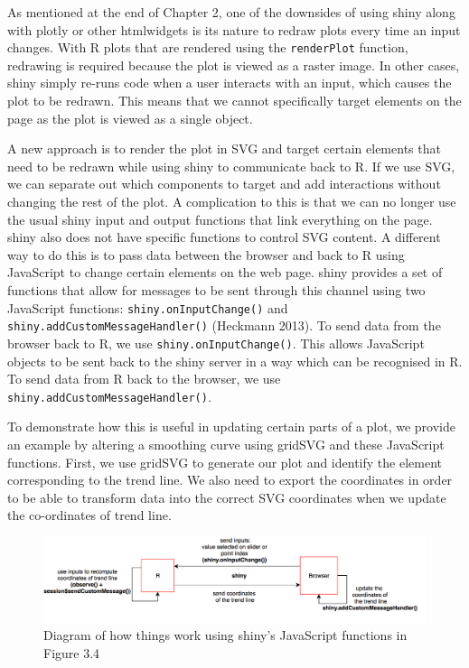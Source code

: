 \documentclass[11pt,]{report}
\begin{document}
As mentioned at the end of Chapter 2, one of the downsides of using
\textsf{shiny} along with \textsf{plotly} or other htmlwidgets is its
nature to redraw plots every time an input changes. With R plots that
are rendered using the \texttt{renderPlot} function, redrawing is
required because the plot is viewed as a raster image. In other cases,
\textsf{shiny} simply re-runs code when a user interacts with an input,
which causes the plot to be redrawn. This means that we cannot
specifically target elements on the page as the plot is viewed as a
single object.

A new approach is to render the plot in SVG and target certain elements
that need to be redrawn while using \textsf{shiny} to communicate back
to R. If we use SVG, we can separate out which components to target and
add interactions without changing the rest of the plot. A complication
to this is that we can no longer use the usual \textsf{shiny} input and
output functions that link everything on the page. \textsf{shiny} also
does not have specific functions to control SVG content. A different way
to do this is to pass data between the browser and back to R using
JavaScript to change certain elements on the web page. \textsf{shiny}
provides a set of functions that allow for messages to be sent through
this channel using two JavaScript functions:
\texttt{shiny.onInputChange()} and
\texttt{shiny.addCustomMessageHandler()} (Heckmann 2013). To send data
from the browser back to R, we use \texttt{shiny.onInputChange()}. This
allows JavaScript objects to be sent back to the \textsf{shiny} server
in a way which can be recognised in R. To send data from R back to the
browser, we use \texttt{shiny.addCustomMessageHandler()}.

To demonstrate how this is useful in updating certain parts of a plot,
we provide an example by altering a smoothing curve using
\textsf{gridSVG} and these JavaScript functions. First, we use
\textsf{gridSVG} to generate our plot and identify the element
corresponding to the trend line. We also need to export the coordinates
in order to be able to transform data into the correct SVG coordinates
when we update the co-ordinates of trend line.

\begin{figure}[H]

{\centering \includegraphics[width=1\linewidth,]{./fig/tl-shiny-diagram} 

}

\caption{\label{fig:tl-shiny-diagram} Diagram of how things work using shiny's JavaScript functions in Figure 3.4}\label{fig:unnamed-chunk-36}
\end{figure}
\end{document}
